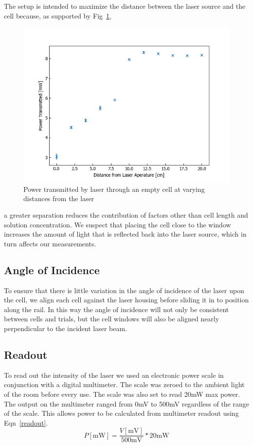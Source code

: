 \documentclass[aps,prl,reprint,groupedaddress,amsmath,amssymb,aps]{revtex4-1}
\begin{document}
	The setup is intended to maximize the distance between the laser source and the cell because, as supported by Fig~\ref{distancetest},
	\begin{figure}[b]
		\includegraphics[width=\columnwidth]{distTest.png}
		\caption{\label{distancetest}Power transmitted by laser through an empty cell at varying distances from the laser}
	\end{figure}
	a greater separation reduces the contribution of factors other than cell length and solution concentration. We suspect that placing the cell close to the window increases the amount of light that is reflected back into the laser source, which in turn affects our measurements.
	
	\subsection{Angle of Incidence}
	To ensure that there is little variation in the angle of incidence of the laser upon the cell, we align each cell against the laser housing before sliding it in to position along the rail. In this way the angle of incidence will not only be consistent between cells and trials, but the cell windows will also be aligned nearly perpendicular to the incident laser beam.
	
	\subsection{Readout}
	To read out the intensity of the laser we used an electronic power scale in conjunction with a digital multimeter. The scale was zeroed to the ambient light of the room before every use. The scale was also set to read 20mW max power. The output on the multimeter ranged from 0mV to 500mV regardless of the range of the scale. This allows power to be calculated from multimeter readout using Eqn~\ref{readout}.
	\begin{equation}
		\label{readout}
		P [\mathrm{mW}] =\frac{V [\mathrm{mV}]}{500 \mathrm{mV}} * 20 \mathrm{mW}
	\end{equation}	
	
\end{document}
